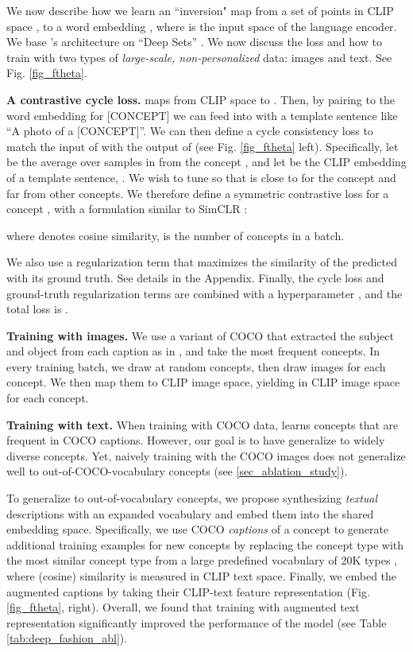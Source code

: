 \documentclass[runningheads]{llncs}
\newcommand{\figref}[1]{Fig. \ref{#1}}
\newcommand\edit[1]{#1}
\newcommand{\concept}{[CONCEPT]}
\begin{document}
\label{learning_ftheta}
We now describe how we learn an ``inversion" map  from a set of points in CLIP space , to a word embedding , where  is the input space of the language encoder.  We base 's architecture on ``Deep Sets'' \cite{zaheer2017deep}.  We now discuss the loss and how to train  with two types of \textit{large-scale, non-personalized} data: images and text. See \figref{fig_ftheta}.





\textbf{A contrastive cycle loss.}
\edit{ maps from CLIP space to . Then, by pairing  to the word embedding for \concept{}
we can feed  into  with a template sentence  like ``A photo of a \concept{}''. We can then define a cycle consistency loss to match the input of  with the output of  (see \figref{fig_ftheta} left)}. Specifically, let  be the average over samples in  from the concept ,  and let
 be the CLIP embedding of a template sentence, . We wish to tune  so that  is close to  for the concept  and far from other concepts. We therefore define a symmetric contrastive loss for a concept , with a formulation similar to SimCLR \cite{chen2020simple}: 






\normalsize
\noindent where  denotes cosine similarity,  is the number of concepts in a batch. 

\edit{We also use a regularization term  that maximizes the similarity of the predicted  with its ground truth. See details in the Appendix.}
\edit{Finally, the cycle loss and ground-truth regularization terms are combined with a  hyperparameter , and the total loss is .}

\textbf{Training  with images.} We use a variant of COCO  \cite{lin2014microsoft} that extracted the subject and object from each caption as in \cite{atzmon2016learning}, and take the  most frequent concepts. In every training batch, we draw at random  concepts, then draw  images for each concept. We then map them to CLIP image space, yielding  in CLIP image space for each concept.

\textbf{Training  with text.}
When training with COCO data,  learns concepts that are frequent in COCO captions. However, our goal is to have  generalize to widely diverse concepts.
Yet, naively training with the COCO images does not generalize well to out-of-COCO-vocabulary concepts (see \ref{sec_ablation_study}).

To generalize to out-of-vocabulary concepts, we propose synthesizing \emph{textual} descriptions with an expanded vocabulary
and embed them into the shared embedding space. Specifically, we use COCO \textit{captions} of a concept to generate additional training examples for new concepts by replacing the concept type with the most similar concept type from a large predefined vocabulary of 20K types \cite{kuznetsova2020open}, where (cosine) similarity is measured in CLIP text space. Finally, we embed the augmented captions by taking their CLIP-text feature representation (\figref{fig_ftheta}, right). Overall, we found that training with augmented text representation significantly improved the performance of the model (see Table \ref{tab:deep_fashion_abl}).
\end{document}
